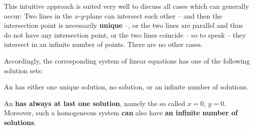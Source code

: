 \begin{MIntro}
This intuitive approach is suited very well to discuss all cases which can generally occur: Two
lines in the $x$-$y$-plane can intersect each other -- and then the intersection point is 
necessarily \textbf{unique} --, or the two lines are parallel and thus do not have any
intersection point, or the two lines coincide -- so to speak -- they intersect in 
an infinite number of points. There are no other cases.

Accordingly, the corresponding system of linear equations has one of the following solution sets: 

\begin{MInfo}
An  
has either one unique solution, no solution, or an infinite number of solutions.

An   
\textbf{has always at last one solution}, namely the so called 
 $x = 0$, $y = 0$.
Moreover, such a homogeneous system \textbf{can} also have \textbf{an infinite number of solutions}.
\end{MInfo}


\end{MIntro}
